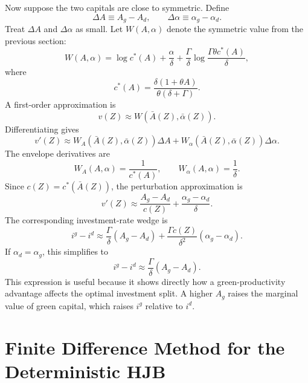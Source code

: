 \documentclass[11pt]{article}
\newcommand{\Abar}{\bar A}
\newcommand{\alphabar}{\bar\alpha}
\newcommand{\DelA}{\Delta A}
\newcommand{\Delalpha}{\Delta\alpha}
\begin{document}
Now suppose the two capitals are close to symmetric. Define
\begin{equation}
    \DelA\equiv A_g-A_d,
    \qquad
    \Delalpha\equiv \alpha_g-\alpha_d.
\end{equation}
Treat $\DelA$ and $\Delalpha$ as small. Let $W(A,\alpha)$ denote the symmetric value from the previous section:
\begin{equation}
    W(A,\alpha)
    =
    \log c^*(A)
    +\frac{\alpha}{\delta}
    +\frac{\Gamma}{\delta}\log\frac{\Gamma\theta c^*(A)}{\delta},
\end{equation}
where
\begin{equation}
    c^*(A)=\frac{\delta(1+\theta A)}{\theta(\delta+\Gamma)}.
\end{equation}
A first-order approximation is
\begin{equation}
    \boxed{
    v(Z)
    \approx
    W\left(\Abar(Z),\alphabar(Z)\right).
    }
\end{equation}
Differentiating gives
\begin{equation}
    v'(Z)
    \approx
    W_A\left(\Abar(Z),\alphabar(Z)\right)\DelA
    +
    W_\alpha\left(\Abar(Z),\alphabar(Z)\right)\Delalpha.
\end{equation}
The envelope derivatives are
\begin{equation}
    W_A(A,\alpha)=\frac{1}{c^*(A)},
    \qquad
    W_\alpha(A,\alpha)=\frac{1}{\delta}.
\end{equation}
Since $c(Z)=c^*(\Abar(Z))$, the perturbation approximation is
\begin{equation}
    \boxed{
    v'(Z)
    \approx
    \frac{A_g-A_d}{c(Z)}
    +
    \frac{\alpha_g-\alpha_d}{\delta}.
    }
\end{equation}
The corresponding investment-rate wedge is
\begin{equation}
    \boxed{
    i^g-i^d
    \approx
    \frac{\Gamma}{\delta}(A_g-A_d)
    +
    \frac{\Gamma c(Z)}{\delta^2}(\alpha_g-\alpha_d).
    }
\end{equation}
If $\alpha_d=\alpha_g$, this simplifies to
\begin{equation}
    \boxed{
    i^g-i^d
    \approx
    \frac{\Gamma}{\delta}(A_g-A_d).
    }
\end{equation}
This expression is useful because it shows directly how a green-productivity advantage affects the optimal investment split. A higher $A_g$ raises the marginal value of green capital, which raises $i^g$ relative to $i^d$.

\section{Finite Difference Method for the Deterministic HJB}
\end{document}
